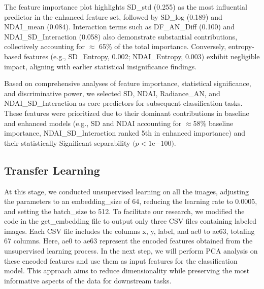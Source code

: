 \documentclass[11pt,letterpaper]{article}
\begin{document}
The feature importance plot highlights SD\_std (0.255) as the most influential predictor in the enhanced feature set, followed by SD\_log (0.189) and NDAI\_mean (0.084). Interaction terms such as DF\_AN\_Diff (0.100) and NDAI\_SD\_Interaction (0.058) also demonstrate substantial contributions, collectively accounting for $\approx$ 65\% of the total importance. Conversely, entropy-based features (e.g., SD\_Entropy, 0.002; NDAI\_Entropy, 0.003) exhibit negligible impact, aligning with earlier statistical insignificance findings.  

Based on comprehensive analyses of feature importance, statistical significance, and discriminative power,  we selected SD, NDAI, Radiance\_AN, and NDAI\_SD\_Interaction as core predictors for subsequent classification tasks. These features were prioritized due to their dominant contributions in baseline and enhanced models (e.g., SD and NDAI accounting for $\approx$58\% baseline importance, NDAI\_SD\_Interaction ranked 5th in enhanced importance) and their statistically Significant separability \(\text{(} p < 1\text{e}{-100} \text{)}\).

\vspace{1em} %
\subsection{Transfer Learning}
\vspace{0.5em} %

At this stage, we conducted unsupervised learning on all the images, adjusting the parameters to an embedding\_size of 64, reducing the learning rate to 0.0005, and setting the batch\_size to 512. To facilitate our research, we modified the code in the get\_embedding file to output only three CSV files containing labeled images. Each CSV file includes the columns x, y, label, and ae0 to ae63, totaling 67 columns. Here, ae0 to ae63 represent the encoded features obtained from the unsupervised learning process. In the next step, we will perform PCA analysis on these encoded features and use them as input features for the classification model. This approach aims to reduce dimensionality while preserving the most informative aspects of the data for downstream tasks.
\end{document}
